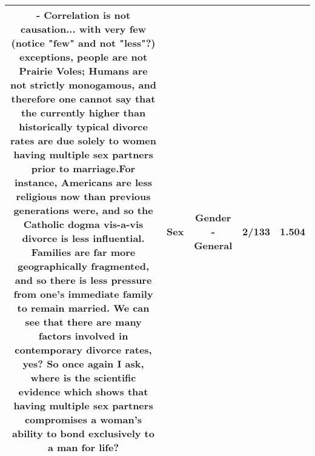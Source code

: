\documentclass[11pt]{article}
\newlength\mylength
\begin{document}
\begin{center}
\begin{longtable}{|C{.65\mylength}|C{.30\mylength}|C{.12\mylength}|C{.12\mylength}|C{.12\mylength}|}
  \small {}- Correlation is not causation...  with very few (notice "few" and not "less"?) exceptions,  people are not Prairie Voles; Humans are not strictly monogamous, and therefore one cannot say that the currently higher than historically typical divorce rates are due solely to women having multiple \textbf{sex} partners prior to marriage.For instance, Americans are less religious now than previous generations were, and so the Catholic dogma vis-a-vis divorce is less influential. Families are far more geographically fragmented, and so there is less pressure from one's immediate family to remain married. We can see that there are many factors involved in contemporary divorce rates, yes? So once again I ask, where is the scientific evidence which shows that having multiple \textbf{sex} partners compromises a woman's ability to bond exclusively to a man for life?\normalsize   & Sex & Gender - General & 2/133 & 1.504 \\  \hline

\end{longtable}
\end{center}
\end{document}
